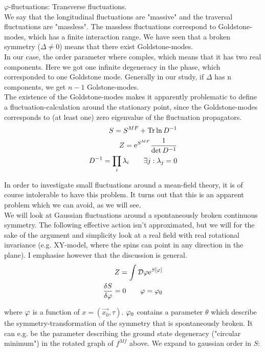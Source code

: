 $\varphi$-fluctuations: Transverse fluctuations. \\

We say that the longitudinal fluctuations are "massive" and the traversal fluctuations are "massless". The massless fluctuations correspond to Goldstone-modes, which has a finite interaction range. We have seen that a broken symmetry ($\Delta \neq 0$) means that there exist Goldstone-modes. \\ 

In our case, the order parameter where comples, which means that it has two real components. Here we got one infinite degeneracy in the phase, which corresponded to one Goldstone mode. Generally in our study, if $\Delta$ has n components, we get $n-1$ Golstone-modes. \\ 

The existence of the Goldstone-modes makes it apparently problematic to define a fluctuation-calculation around the stationary point, since the Goldstone-modes corresponds to (at least one) zero eigenvalue of the fluctuation propagators. 
\begin{align*}
    S = S^{MF} + \Tr \ln D^{-1} \\ 
    Z = \mathrm{e}^{S^{MF}}\frac{1}{\det D^{-1}} \\ 
    D^{-1} = \prod_i \lambda_i \quad \quad \exists j : \lambda_j = 0 
\end{align*}

In order to investigate small fluctuations around a mean-field theory, it is of course intolerable to have this problem. It turns out that this is an apparent problem which we can avoid, as we will see. \\ 

We will look at Gaussian fluctuations around a spontaneously broken continuous symmetry. The following effective action isn't approximated, but we will for the sake of the argument and simplicity look at a real field with real rotational invariance (e.g. XY-model, where the spins can point in any direction in the plane). I emphasise however that the discussion is general. \\ 

\begin{align*}
    Z = \int \D \p \e^{S[\p]} \\ 
    \fdv{S}{\p} = 0 \quad \quad  \p = \p_0
\end{align*}

where $\varphi$ is a function of $x = (\Vec{x_0}, \tau)$. $\varphi_0$ contains a parameter $\theta$ which describe the symmetry-transformation of the symmetry that is spontaneously broken. It can e.g. be the parameter describing the ground state degeneracy ("circular minimum") in the rotated graph of $f^{Mf}$ above. We expand to gaussian order in $S$:

